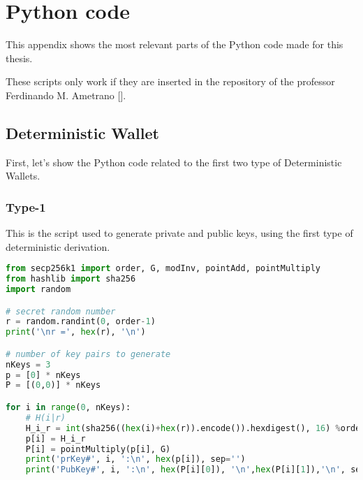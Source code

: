 \chapter{Python code}%
\label{AppendixB} %
This appendix shows the most relevant parts of the Python code made for this thesis. 

\begin{remark}
	These scripts only work if they are inserted in the repository of the professor Ferdinando M. Ametrano [\cite{13}].
\end{remark}

\section{Deterministic Wallet} 
First, let's show the Python code related to the first two type of Deterministic Wallets.

\subsection{Type-1}
\begin{flushleft}
	This is the script used to generate private and public keys, using the first type of deterministic derivation.
\end{flushleft}
\begin{lstlisting}[language=Python]
from secp256k1 import order, G, modInv, pointAdd, pointMultiply
from hashlib import sha256
import random

# secret random number
r = random.randint(0, order-1)
print('\nr =', hex(r), '\n')

# number of key pairs to generate
nKeys = 3
p = [0] * nKeys
P = [(0,0)] * nKeys

for i in range(0, nKeys):
	# H(i|r)
	H_i_r = int(sha256((hex(i)+hex(r)).encode()).hexdigest(), 16) %order
	p[i] = H_i_r
	P[i] = pointMultiply(p[i], G)
	print('prKey#', i, ':\n', hex(p[i]), sep='')
	print('PubKey#', i, ':\n', hex(P[i][0]), '\n',hex(P[i][1]),'\n', sep='')
\end{lstlisting}



